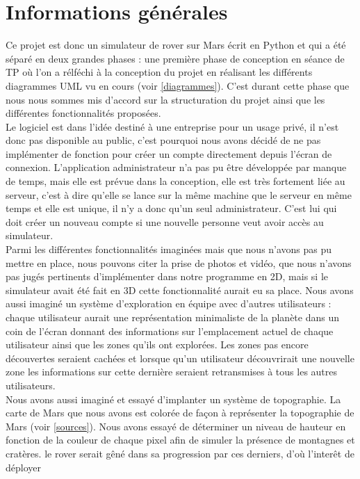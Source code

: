 \documentclass[12pt,a4paper]{scrartcl}
\begin{document}
\section{Informations générales}
Ce projet est donc un simulateur de rover sur Mars écrit en Python et qui a été séparé en deux grandes phases : 
une première phase de conception en séance de TP où l'on a rélféchi à la conception du projet en réalisant
les différents diagrammes UML vu en cours (voir \ref{diagrammes}). C'est durant cette phase que nous nous sommes mis d'accord
sur la structuration du projet ainsi que les différentes fonctionnalités proposées.\\
Le logiciel est dans l'idée destiné à une entreprise pour un usage privé, il n'est donc pas disponible
au public, c'est pourquoi nous avons décidé de ne pas implémenter de fonction pour créer un compte directement depuis
l'écran de connexion. L'application administrateur n'a pas pu être développée par manque de temps, mais elle est prévue
dans la conception, elle est très fortement liée au serveur, c'est à dire qu'elle se lance sur la même machine que le serveur
en même temps et elle est unique, il n'y a donc qu'un seul administrateur. C'est lui qui doit créer un nouveau compte si une nouvelle
personne veut avoir accès au simulateur.\\
Parmi les différentes fonctionnalités imaginées mais que nous n'avons pas pu mettre en place, nous pouvons citer
la prise de photos et vidéo, que nous n'avons pas jugés pertinents d'implémenter dans notre programme en 2D, mais si 
le simulateur avait été fait en 3D cette fonctionnalité aurait eu sa place. Nous avons aussi imaginé un système d'exploration
en équipe avec d'autres utilisateurs : chaque utilisateur aurait une représentation minimaliste de la planète dans un coin de l'écran
donnant des informations sur l'emplacement actuel de chaque utilisateur ainsi que les zones qu'ils ont explorées. Les zones
pas encore découvertes seraient cachées et lorsque qu'un utilisateur découvrirait une nouvelle zone les informations sur cette dernière
seraient retransmises à tous les autres utilisateurs.\\
Nous avons aussi imaginé et essayé d'implanter un système de topographie. La carte de Mars que nous avons est colorée de façon
à représenter la topographie de Mars (voir \ref{sources}). Nous avons essayé de déterminer un niveau de hauteur en fonction de la couleur de chaque pixel
afin de simuler la présence de montagnes et cratères. le rover serait gêné dans sa progression par ces derniers, d'où l'interêt de déployer
\end{document}
